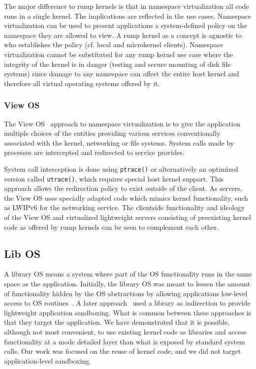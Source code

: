 The major difference to rump kernels is that in namespace virtualization
all code runs in a single kernel.  The implications are
reflected in the use cases.  Namespace virtualization can be used to
present applications a system-defined policy on the namespace they
are allowed to view.  A rump kernel as a concept is agnostic to who
establishes the policy (cf. local and microkernel clients).
Namespace virtualization cannot be substituted for any rump kernel
use case where the integrity of the kernel is in danger (\eg testing
and secure mounting of disk file systems) since damage to any
namespace can affect the entire host kernel and therefore all
virtual operating systems offered by it.

\subsubsection*{View OS}

The View OS~\cite{gardenghi:viewos} approach to namespace virtualization
is to give the application multiple choices of the entities providing
various services conventionally associated with the kernel, \eg networking
or file systems.  System calls made by processes are intercepted and
redirected to service provides.

System call interception is done using \texttt{ptrace()} or alternatively
an optimized version called \texttt{utrace()}, which requires special
host kernel support.  This approach allows the redirection policy to
exist outside of the client.  As servers, the View OS uses specially
adapted code which mimics kernel functionality, such as LWIPv6 for the
networking service.  The clientside functionality and ideology of the View
OS and virtualized lightweight servers consisting of preexisting kernel
code as offered by rump kernels can be seen to complement each other.

\subsection{Lib OS}

A library OS means a system where part of the OS functionality runs in
the same space as the application.  Initially, the library OS was meant
to lessen the amount of functionality hidden by the OS abstractions by
allowing applications low-level access to OS routines~\cite{engler:exo,
kaashoek:exoapp}.  A later approach~\cite{porter:drawbridge} used a
library as indirection to provide lightweight application sandboxing.
What is common between these approaches is that they target the
application.  We have demonstrated that it is possible, although not
most convenient, to use existing kernel code as libraries and access
functionality at a mode detailed layer than what is exposed by standard
system calls.  Our work was focused on the reuse of kernel code, and
we did not target application-level sandboxing.

